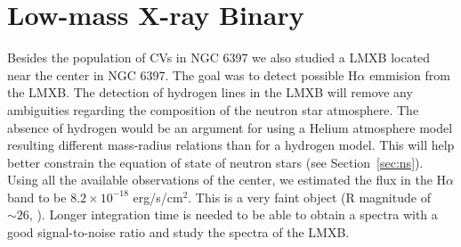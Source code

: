 \section{Low-mass X-ray Binary}


Besides the population of CVs in NGC 6397 we also studied a LMXB located near the center in NGC 6397. The goal was to detect possible H$\alpha$ emmision from the LMXB. The detection of hydrogen lines in the LMXB  will remove any ambiguities regarding the composition of the neutron star atmosphere. The absence of hydrogen  would be an argument for using a Helium atmosphere model resulting different mass-radius relations than for a hydrogen model. This will help better constrain the equation of state of neutron stars (see Section~\ref{sec:ns}). Using all the available observations of the center, we estimated the flux in the H$\alpha$ band to be $8.2 \times 10^{-18}$ erg/s/cm$^2$. This is a very faint object (R magnitude of $\sim 26$, \cite{heinke_improved_2014}). Longer integration time is needed to be able to obtain a spectra with a good signal-to-noise ratio and study the spectra of the LMXB. 

